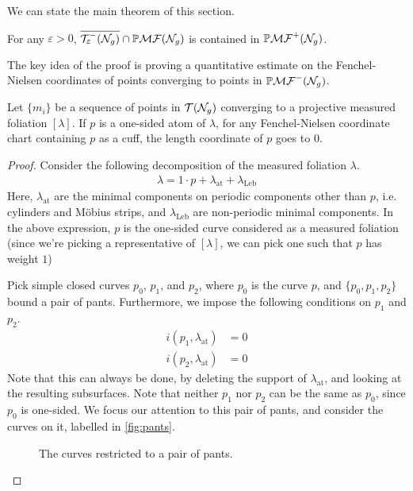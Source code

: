 \documentclass[12pt, reqno]{amsart}
\begin{document}
We can state the main theorem of this section.
\begin{theorem}
  \label{thm:systole-closure}
  For any $\varepsilon > 0$, $\overline{\mathcal{T}_{\varepsilon}^{-}(\mathcal{N}_g)} \cap \mathbb{P}\mathcal{MF}(\mathcal{N}_g)$ is contained in $\mathbb{P}\mathcal{MF}^+(\mathcal{N}_g)$.
\end{theorem}
The key idea of the proof is proving a quantitative estimate on the Fenchel-Nielsen coordinates of points converging to points in $\mathbb{P}\mathcal{MF}^-(\mathcal{N}_g)$.
\begin{proposition}
  \label{prop:pinching}
  Let $\{m_i\}$ be a sequence of points in $\mathcal{T}(\mathcal{N}_g)$ converging to a projective measured foliation $[\lambda]$.
  If $p$ is a one-sided atom of $\lambda$, for any Fenchel-Nielsen coordinate chart containing $p$ as a cuff, the length coordinate of $p$ goes to $0$.
\end{proposition}
\begin{proof}
  Consider the following decomposition of the measured foliation $\lambda$.
  \begin{align*}
    \lambda = 1 \cdot p + \lambda_{\mathrm{at}} + \lambda_{\mathrm{Leb}}
  \end{align*}
  Here, $\lambda_{\mathrm{at}}$ are the minimal components on periodic components other than $p$, i.e. cylinders and Möbius strips, and $\lambda_{\mathrm{Leb}}$ are non-periodic minimal components.
  In the above expression, $p$ is the one-sided curve considered as a measured foliation (since we're picking a representative of $[\lambda]$, we can pick one such that $p$ has weight $1$)

  Pick simple closed curves $p_0$, $p_1$, and $p_2$, where $p_0$ is the curve $p$, and $\{p_0, p_1, p_2\}$ bound a pair of pants.
  Furthermore, we impose the following conditions on $p_1$ and $p_2$.
  \begin{align*}
    i(p_1, \lambda_{\mathrm{at}}) &= 0 \\
    i(p_2, \lambda_{\mathrm{at}}) &= 0
  \end{align*}
  Note that this can always be done, by deleting the support of $\lambda_{\mathrm{at}}$, and looking at the resulting subsurfaces.
  Note that neither $p_1$ nor $p_2$ can be the same as $p_0$, since $p_0$ is one-sided.
  We focus our attention to this pair of pants, and consider the curves on it, labelled in \autoref{fig:pants}.
  \begin{figure}[h]
    \centering
    \caption{The curves restricted to a pair of pants.}
    \label{fig:pants}
  \end{figure}


\end{proof}
\end{document}
